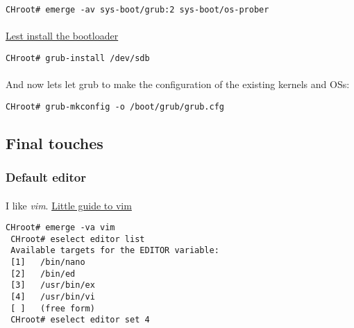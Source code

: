 \documentclass[10pt,a4paper]{article}
\begin{document}
                    \begin{lstlisting}[style=BashInputCHRoot]
 CHroot# emerge -av sys-boot/grub:2 sys-boot/os-prober
                    \end{lstlisting}
                    
                    \paragraph{}  \href{https://wiki.gentoo.org/wiki/GRUB2#BIOS_with_MBR}{Lest install the bootloader}
                    
                    \begin{lstlisting}[style=BashInputCHRoot]
 CHroot# grub-install /dev/sdb
                    \end{lstlisting}
                    
                    \paragraph{} And now lets let grub to make the configuration of the existing kernels and OSs:

                    \begin{lstlisting}[style=BashInputCHRoot]
 CHroot# grub-mkconfig -o /boot/grub/grub.cfg
                    \end{lstlisting}
                    
            \newpage
            \subsection{Final touches}
                
                \subsubsection{Default editor}
                
                    \paragraph{} I like \textit{vim}. \href{https://wiki.gentoo.org/wiki/Vim/Guide}{Little guide to vim} 
                    \begin{lstlisting}[style=BashInputCHRoot]
 CHroot# emerge -va vim                 
 CHroot# eselect editor list
 Available targets for the EDITOR variable:
 [1]   /bin/nano
 [2]   /bin/ed
 [3]   /usr/bin/ex
 [4]   /usr/bin/vi 
 [ ]   (free form)
 CHroot# eselect editor set 4
                    \end{lstlisting}
                    
\end{document}
